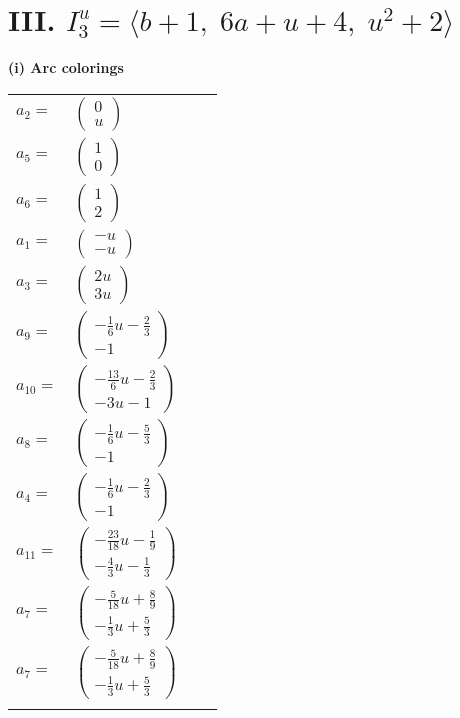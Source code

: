 \documentclass[1p]{elsarticle_modified}
\theoremstyle{definition}
\begin{document}
\centering \section*{III. $I^u_{3}= \langle b+1,\;6 a+u+4,\;u^2+2 \rangle$}
\flushleft \textbf{(i) Arc colorings}\\
\begin{tabular}{m{7pt} m{180pt} m{7pt} m{180pt} }
\flushright $a_{2}=$&$\begin{pmatrix}0\\u\end{pmatrix}$ \\
\flushright $a_{5}=$&$\begin{pmatrix}1\\0\end{pmatrix}$ \\
\flushright $a_{6}=$&$\begin{pmatrix}1\\2\end{pmatrix}$ \\
\flushright $a_{1}=$&$\begin{pmatrix}- u\\- u\end{pmatrix}$ \\
\flushright $a_{3}=$&$\begin{pmatrix}2 u\\3 u\end{pmatrix}$ \\
\flushright $a_{9}=$&$\begin{pmatrix}-\frac{1}{6} u-\frac{2}{3}\\-1\end{pmatrix}$ \\
\flushright $a_{10}=$&$\begin{pmatrix}-\frac{13}{6} u-\frac{2}{3}\\-3 u-1\end{pmatrix}$ \\
\flushright $a_{8}=$&$\begin{pmatrix}-\frac{1}{6} u-\frac{5}{3}\\-1\end{pmatrix}$ \\
\flushright $a_{4}=$&$\begin{pmatrix}-\frac{1}{6} u-\frac{2}{3}\\-1\end{pmatrix}$ \\
\flushright $a_{11}=$&$\begin{pmatrix}-\frac{23}{18} u-\frac{1}{9}\\-\frac{4}{3} u-\frac{1}{3}\end{pmatrix}$ \\
\flushright $a_{7}=$&$\begin{pmatrix}-\frac{5}{18} u+\frac{8}{9}\\-\frac{1}{3} u+\frac{5}{3}\end{pmatrix}$\\ \flushright $a_{7}=$&$\begin{pmatrix}-\frac{5}{18} u+\frac{8}{9}\\-\frac{1}{3} u+\frac{5}{3}\end{pmatrix}$\\&\end{tabular}
\end{document}
